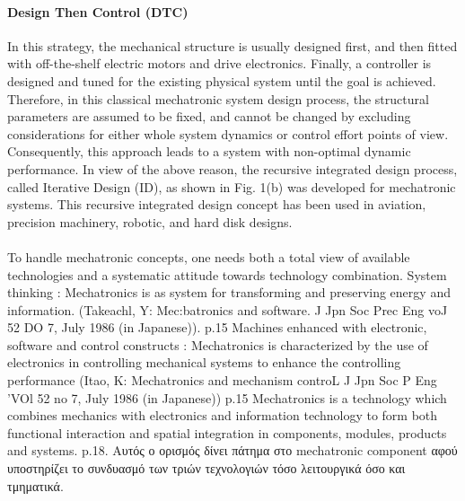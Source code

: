 \documentclass[a4paper,12pt,twoside]{report}
\begin{document}
{			\paragraph{Design Then Control (DTC)} {In this strategy, the mechanical structure is usually designed first, and then fitted with off-the-shelf electric motors and drive electronics. Finally, a controller is designed and tuned for the existing physical system until the goal is achieved. Therefore, in this classical mechatronic system design process, the structural parameters are assumed to be fixed, and cannot be changed by excluding considerations for either whole system dynamics or control effort points of view. Consequently, this approach leads to a system with non-optimal dynamic performance. In view of the above reason, the recursive integrated design process, called Iterative Design (ID), as shown in Fig. 1(b) was developed for mechatronic systems. This recursive integrated design concept has been used in aviation, precision machinery, robotic, and hard disk designs.\cite{IntegratedDesignForAMechatronicFeedDriveSystemOfMachineTools:Chen2005}		
			}

			\paragraph{} {To handle mechatronic concepts, one needs both a total view of available technologies and a systematic attitude towards technology combination. \cite{ATheoreticalApproachOnMechatronicsDesign:Buur1990}
			\linebreak
			System thinking : Mechatronics is as system for transforming and preserving energy and information. (Takeachl, Y: Mec:batronics and software. J Jpn Soc Prec Eng voJ 52 DO 7, July 1986 (in Japanese)). \cite{ATheoreticalApproachOnMechatronicsDesign:Buur1990} p.15
			\linebreak
			Machines enhanced with electronic, software and control constructs : Mechatronics is characterized by the use of electronics in controlling mechanical systems to enhance the controlling performance (Itao, K: Mechatronics and mechanism controL J Jpn Soc P Eng 'VOl 52 no 7, July 1986 (in Japanese)) \cite{ATheoreticalApproachOnMechatronicsDesign:Buur1990} p.15
			\linebreak
			Mechatronics is a technology which combines mechanics with electronics and information technology to form both functional interaction and spatial integration in components, modules, products and systems.\cite{ATheoreticalApproachOnMechatronicsDesign:Buur1990} p.18. Αυτός ο ορισμός δίνει πάτημα στο mechatronic component αφού υποστηρίζει το συνδυασμό των τριών τεχνολογιών τόσο λειτουργικά όσο και τμηματικά.
			}
			
}
\end{document}
